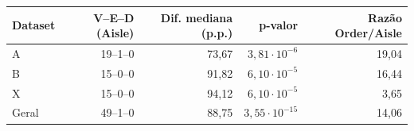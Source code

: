 \small
\begin{tabular}{lrrrr}
\toprule
Dataset & V--E--D (Aisle) & Dif. mediana (p.p.) & p-valor & Razão Order/Aisle \\
\midrule
A & 19--1--0 & 73,67 & $3,81\cdot 10^{-6}$ & 19,04 \\
B & 15--0--0 & 91,82 & $6,10\cdot 10^{-5}$ & 16,44 \\
X & 15--0--0 & 94,12 & $6,10\cdot 10^{-5}$ & 3,65 \\
Geral & 49--1--0 & 88,75 & $3,55\cdot 10^{-15}$ & 14,06 \\
\bottomrule
\end{tabular}

